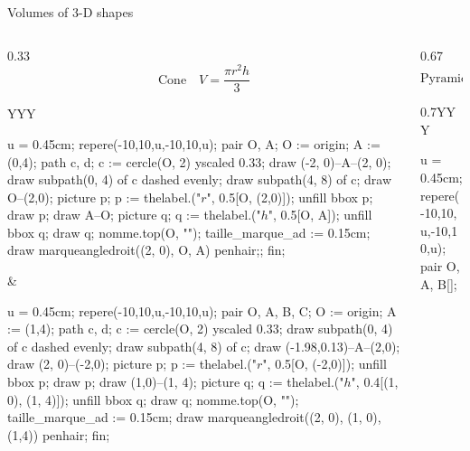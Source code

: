 \documentclass[9pt,aspectratio=169]{beamer}
\begin{document}
\begin{frame}{Volumes of 3-D shapes}
\begin{columns}[T]
\begin{column}{0.33\textwidth}
      \bigskip
      \[ \text{Cone} \quad V = \frac{\pi r^2 h}{3} \]
      \begin{tabularx}{\textwidth}{YYY}
        \begin{mplibcode}
          u = 0.45cm;
          repere(-10,10,u,-10,10,u);
            pair O, A;
            O := origin;
            A := (0,4);
            path c, d;
            c := cercle(O, 2) yscaled 0.33;
            draw (-2, 0)--A--(2, 0);
            draw subpath(0, 4) of c dashed evenly;
            draw subpath(4, 8) of c;
            draw O--(2,0);
            picture p;
            p := thelabel.("$r$", 0.5[O, (2,0)]);
            unfill bbox p;
            draw p;
            draw A--O;
            picture q;
            q := thelabel.("$h$", 0.5[O, A]);
            unfill bbox q;
            draw q;
            nomme.top(O, "");
            taille_marque_ad := 0.15cm;
            draw marqueangledroit((2, 0), O, A) penhair;;
          fin;
        \end{mplibcode}
        &
        \hspace*{1em}
        \begin{mplibcode}
          u = 0.45cm;
          repere(-10,10,u,-10,10,u);
            pair O, A, B, C;
            O := origin;
            A := (1,4);
            path c, d;
            c := cercle(O, 2) yscaled 0.33;
            draw subpath(0, 4) of c dashed evenly;
            draw subpath(4, 8) of c;        
            draw (-1.98,0.13)--A--(2,0);
            draw (2, 0)--(-2,0);
            picture p;
            p := thelabel.("$r$", 0.5[O, (-2,0)]);
            unfill bbox p;
            draw p;
            draw (1,0)--(1, 4);
            picture q;
            q := thelabel.("$h$", 0.4[(1, 0), (1, 4)]);
            unfill bbox q;
            draw q;
            nomme.top(O, "");
            taille_marque_ad := 0.15cm;
            draw marqueangledroit((2, 0), (1, 0), (1,4)) penhair;
          fin;
        \end{mplibcode}
      \end{tabularx}
    \end{column}
    \begin{column}{0.67\textwidth}
      \[ \text{Pyramid} \quad V = \frac{\text{Base Area}\times h}{3} \]
      \begin{center}
        \begin{tabularx}{0.7\textwidth}{YYY}
          \begin{mplibcode}
            u = 0.45cm;
            repere(-10,10,u,-10,10,u);
              pair O, A, B[];

\end{mplibcode}
\end{tabularx}
\end{center}
\end{column}
\end{columns}
\end{frame}
\end{document}
